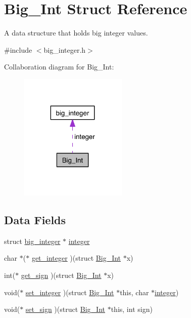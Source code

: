 \hypertarget{struct_big___int}{\section{Big\-\_\-\-Int Struct Reference}
\label{struct_big___int}
}


A data structure that holds big integer values.  




{\ttfamily \#include $<$big\-\_\-integer.\-h$>$}



Collaboration diagram for Big\-\_\-\-Int\-:\nopagebreak
\begin{figure}[H]
\begin{center}
\leavevmode
\includegraphics[width=145pt]{struct_big___int__coll__graph}
\end{center}
\end{figure}
\subsection*{Data Fields}
\begin{DoxyCompactItemize}
\item 
struct \hyperlink{big__integer__impl_8h_structbig__integer}{big\-\_\-integer} $\ast$ \hyperlink{struct_big___int_af78495b20eeda6242727ea99032693c2}{integer}
\item 
char $\ast$($\ast$ \hyperlink{struct_big___int_ac8d650b12656faee53d9ebd863e9fe8f}{get\-\_\-integer} )(struct \hyperlink{struct_big___int}{Big\-\_\-\-Int} $\ast$x)
\item 
int($\ast$ \hyperlink{struct_big___int_ae06ba678ba07ecdac264605bc8576da2}{get\-\_\-sign} )(struct \hyperlink{struct_big___int}{Big\-\_\-\-Int} $\ast$x)
\item 
void($\ast$ \hyperlink{struct_big___int_a34a65fb8d8cc2acf5a14a18c420ee774}{set\-\_\-integer} )(struct \hyperlink{struct_big___int}{Big\-\_\-\-Int} $\ast$this, char $\ast$\hyperlink{struct_big___int_af78495b20eeda6242727ea99032693c2}{integer})
\item 
void($\ast$ \hyperlink{struct_big___int_a70cf790b3af136aad25fa028cde3e801}{set\-\_\-sign} )(struct \hyperlink{struct_big___int}{Big\-\_\-\-Int} $\ast$this, int sign)
\end{DoxyCompactItemize}


